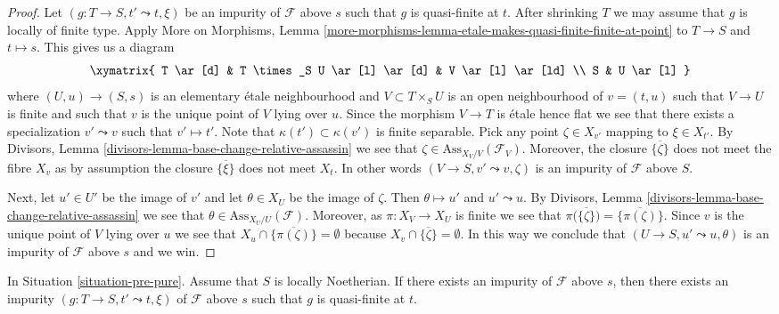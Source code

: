 \begin{proof}
Let $(g : T \to S, t' \leadsto t, \xi)$ be an impurity of
$\mathcal{F}$ above $s$ such that $g$ is quasi-finite at $t$.
After shrinking $T$ we may assume that $g$ is locally of finite type.
Apply
More on Morphisms,
Lemma \ref{more-morphisms-lemma-etale-makes-quasi-finite-finite-at-point}
to $T \to S$ and $t \mapsto s$. This gives us a diagram
$$
\xymatrix{
T \ar[d] & T \times_S U \ar[l] \ar[d] & V \ar[l] \ar[ld] \\
S & U \ar[l]
}
$$
where $(U, u) \to (S, s)$ is an elementary \'etale neighbourhood
and $V \subset T \times_S U$ is an open neighbourhood of $v = (t, u)$
such that $V \to U$ is finite and such that $v$ is the unique point of $V$
lying over $u$. Since the morphism $V \to T$ is \'etale
hence flat we see that there exists a specialization $v' \leadsto v$ such
that $v' \mapsto t'$. Note that $\kappa(t') \subset \kappa(v')$
is finite separable. Pick any point $\zeta \in X_{v'}$ mapping to
$\xi \in X_{t'}$. By
Divisors, Lemma \ref{divisors-lemma-base-change-relative-assassin}
we see that $\zeta \in \text{Ass}_{X_V/V}(\mathcal{F}_V)$.
Moreover, the closure $\overline{\{\zeta\}}$ does not meet
the fibre $X_v$ as by assumption the closure $\overline{\{\xi\}}$
does not meet $X_t$. In other words $(V \to S, v' \leadsto v, \zeta)$
is an impurity of $\mathcal{F}$ above $S$.

\medskip\noindent
Next, let $u' \in U'$ be the image of $v'$ and let
$\theta \in X_U$ be the image of $\zeta$.
Then $\theta \mapsto u'$ and $u' \leadsto u$.
By
Divisors, Lemma \ref{divisors-lemma-base-change-relative-assassin}
we see that $\theta \in \text{Ass}_{X_U/U}(\mathcal{F})$.
Moreover, as $\pi : X_V \to X_U$ is finite we see that
$\pi\big(\overline{\{\zeta\}}\big) = \overline{\{\pi(\zeta)\}}$. Since
$v$ is the unique point of $V$ lying over $u$ we see that
$X_u \cap \overline{\{\pi(\zeta)\}} = \emptyset$ because
$X_v \cap \overline{\{\zeta\}} = \emptyset$. In this way we conclude that
$(U \to S, u' \leadsto u, \theta)$ is an impurity of
$\mathcal{F}$ above $s$ and we win.
\end{proof}

\begin{lemma}
\label{lemma-Noetherian-impurity-quasi-finite}
In Situation \ref{situation-pre-pure}.
Assume that $S$ is locally Noetherian.
If there exists an impurity of $\mathcal{F}$ above $s$, then
there exists an impurity $(g : T \to S, t' \leadsto t, \xi)$
of $\mathcal{F}$ above $s$ such that $g$ is quasi-finite at $t$.
\end{lemma}

